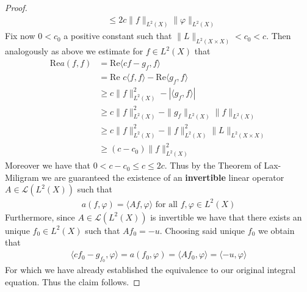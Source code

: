 \documentclass[12pt,a4paper]{article}
\begin{document}
\begin{proof}
\begin{align*}
& \leq 2c \|f\|_{L^2(X)} \| \varphi\|_{L^2(X)}
\end{align*}
\newpage
Fix now $0 < c_0$ a positive constant such that $\|L\|_{L^2(X \times X)}<c_0 <c$. Then analogously as above we estimate for $f \in L^2(X)$ that
\begin{align*}
\text{Re} a(f,f)& = \text{Re} \langle cf-g_f,f \rangle \\
& = \text{Re }c \langle f, f \rangle - \text{Re} \langle g_f,f \rangle \\ 
&\geq  c \|f\|_{L^2(X)}^2 - | \langle g_f,f \rangle |  \\
& \geq c \|f\|_{L^2(X)}^2 - \|g_f \|_{L^2(X)} \|f \|_{L^2(X)} \\
& \geq c \| f \|_{L^2(X)}^2 - \|f\|_{L^2(X)}^2 \|L\|_{L^2(X \times X)} \\ 
& \geq (c-c_0) \| f\|_{L^2(X)}^2 
\end{align*}
Moreover we have that $0<c-c_0 \leq c \leq 2c$. Thus by the Theorem of Lax-Miligram we are guaranteed the existence of an \textbf{invertible} linear operator $A \in \mathcal{L}(L^2(X))$ such that 
\begin{align*}
a(f, \varphi) = \langle Af, \varphi \rangle \text{ for all } f, \varphi \in L^2(X)
\end{align*} 
Furthermore, since $A \in \mathcal{L}(L^2(X))$ is invertible we have that there exists an unique $f_0 \in L^2(X)$ such that $Af_0=-u$. Choosing said unique $f_0$ we obtain that 
\begin{align*}
\langle cf_0-g_{f_0}, \varphi \rangle =a(f_0, \varphi) = \langle Af_0 , \varphi \rangle = \langle -u , \varphi \rangle 
\end{align*}
For which we have already established the equivalence to our original integral equation. Thus the claim follows. 
\end{proof}
\newpage
\end{document}
